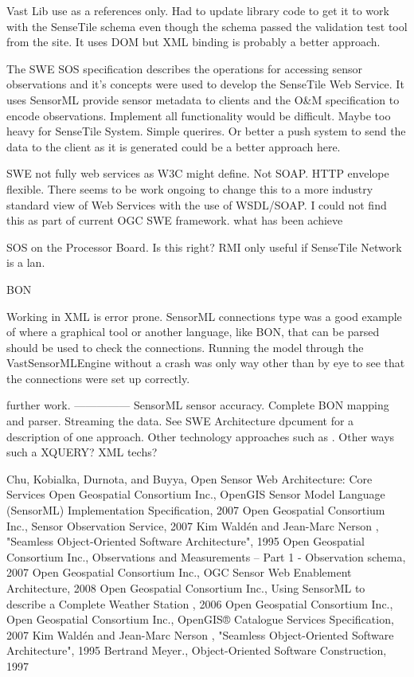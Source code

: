 \documentclass[]{final_report}
\begin{document}
Vast Lib use as a references only.
Had to update library code to get it to work with the SenseTile schema even though the schema
passed the validation test tool from the site. It uses DOM but XML binding is probably a better approach.

The SWE SOS specification describes the operations for accessing sensor observations and it's concepts were used to develop the SenseTile Web Service. It uses SensorML provide sensor metadata to clients and the O\&M specification to encode observations.
Implement all functionality would be difficult. Maybe too heavy for SenseTile System. Simple querires. Or better a push system to send the data to the client as it is generated could be a better approach here.

SWE not fully web services as W3C might define. Not SOAP. HTTP envelope
flexible. There seems to be work ongoing to change this to a more industry standard view of Web Services with the use of WSDL/SOAP. I could not find this as part of current OGC SWE framework.
what has been achieve

SOS on the Processor Board. Is this right? RMI only useful if SenseTile Network is a lan.

BON

Working in XML is error prone. SensorML connections type was a good example of where a graphical tool or another language, like BON,  that can be parsed should be used to check the connections. Running the model through the VastSensorMLEngine without a crash was only way other than by eye to see that the connections were set up correctly. 


further work.
---------------
SensorML sensor accuracy.
Complete BON mapping and parser.
Streaming the data. See SWE Architecture dpcument for a description of one approach.
Other technology approaches such as . Other ways such a XQUERY? XML techs?

\newpage
\begin{thebibliography}{99}
 Chu, Kobialka,  Durnota, and  Buyya, Open Sensor Web Architecture: Core Services
Open Geospatial Consortium Inc., OpenGIS Sensor Model Language (SensorML) Implementation Specification, 2007
Open Geospatial Consortium Inc.,  Sensor Observation Service, 2007
Kim Waldén and Jean-Marc Nerson , "Seamless Object-Oriented Software Architecture", 1995
Open Geospatial Consortium Inc., Observations and Measurements – Part 1 - Observation schema, 2007
Open Geospatial Consortium Inc., OGC Sensor Web Enablement Architecture, 2008
Open Geospatial Consortium Inc., Using SensorML to describe a
Complete Weather Station , 2006
Open Geospatial Consortium Inc.,
Open Geospatial Consortium Inc., OpenGIS® Catalogue Services Specification, 2007
Kim Waldén and Jean-Marc Nerson , "Seamless Object-Oriented Software Architecture", 1995
Bertrand Meyer., Object-Oriented Software Construction, 1997

\end{thebibliography}
\end{document}
